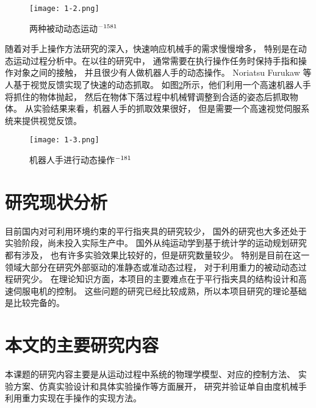 \begin{figure}[!ht]
  \centering
  \texttt{[image: 1-2.png]}
  \caption{两种被动动态运动\cite{ref7}$^{-\rm 1581}$}
  \label{fig:1-2}
  \vspace{-0.3cm}
\end{figure}

随着对手上操作方法研究的深入，快速响应机械手的需求慢慢增多，
特别是在动态运动过程分析中。在以往的研究中，
通常需要在执行操作任务时保持手指和操作对象之间的接触，
并且很少有人做机器人手的动态操作。
Noriatsu Furukaw 等人基于视觉反馈实现了快速的动态抓取。
如图\ref{fig:1-3}所示，他们利用一个高速机器人手将抓住的物体抛起，
然后在物体下落过程中机械臂调整到合适的姿态后抓取物体。
从实验结果来看，机器人手的抓取效果很好，
但是需要一个高速视觉伺服系统来提供视觉反馈\cite{ref8}。

\begin{figure}[!ht]
  \centering
  \texttt{[image: 1-3.png]}
  \caption{机器人手进行动态操作\cite{ref8}$^{-\rm 181}$}
  \label{fig:1-3}
  \vspace{-0.3cm}
\end{figure}

\section{研究现状分析}
目前国内对可利用环境约束的平行指夹具的研究较少，
国外的研究也大多还处于实验阶段，尚未投入实际生产中。
国外从纯运动学到基于统计学的运动规划研究都有涉及，
也有许多实验效果比较好的，但是研究数量较少。
特别是目前在这一领域大部分在研究外部驱动的准静态或准动态过程，
对于利用重力的被动动态过程研究少。
在理论知识方面，本项目的主要难点在于平行指夹具的结构设计和高速伺服电机的控制。
这些问题的研究已经比较成熟，所以本项目研究的理论基础是比较完备的。

\section{本文的主要研究内容}
本课题的研究内容主要是从运动过程中系统的物理学模型、对应的控制方法、
实验方案、仿真实验设计和具体实验操作等方面展开，
研究并验证单自由度机械手利用重力实现在手操作的实现方法。

